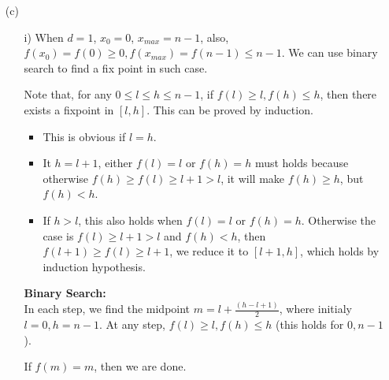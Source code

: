 \documentclass[twoside]{homework}
\begin{document}
\begin{enumerate}
\begin{proof}
			In the proof of (a), we keep calculating $x_i$ with the formula $x_{i+1} = f(x_{i})$. In each step, we calculate $x_{i+1} = f(x_i)$, if $x_{i+1} = f(x_i) = x_i$, then we find our fixpoint. Otherwise we go next step with $x_{i+2}$ base on $x_{i+1}$. Note that if $x_{i+1} = f(x_i) \neq x_i$, then at least one component of $x_{i+1}$ is at least 1 larger than that component of $x_i$ ($x_{i+1} > x_i$). If we don't see any fixpoint and we keep going on, then we run into $x_k = (n-1, n-1,...,n-1)$, at this point, it must hold that $x_{k+1} = f(x_k) = x_k$, because there exists no such d-tuple $x'$ in $G(d, n)$ s.t. $x' > x_k = (n-1, n-1, ..., n-1)$.

			The maximum number of steps we can do until we get $(n-1, n-1, ..., n-1)$ is $O(nd)$. In each step, we only need to evaluate $f$ on $x_i$ and compare $f(x_i)$ with $x_i$, which can be done in $O(1)$. Therefore a fixpoint can be found in time $O(nd)$.
		\end{proof}

	\item [(c)]
		\begin{enumerate}
			\item [i)] When $d=1$, $x_0 = 0$, $x_{max} = n-1$, also, $f(x_0) = f(0) \geq 0, f(x_{max}) = f(n-1) \leq n-1$. We can use binary search to find a fix point in such case.

			Note that,
				for any $0 \leq l \leq h \leq n-1$, if $f(l) \geq l, f(h) \leq h$, then there exists a fixpoint in $[l, h]$.
			This can be proved by induction.
			\begin{itemize}
				\item This is obvious if $l = h$.
				\item It $h = l + 1$, either $f(l) = l$ or $f(h) = h$ must holds because otherwise $f(h) \geq f(l) \geq l + 1 > l$, it will make $f(h) \geq h$, but $f(h) < h$.
				\item If $h > l$, this also holds when $f(l) = l$ or $f(h) = h$. Otherwise the case is $f(l) \geq l+1 > l$ and $f(h) < h$, then $f(l+1) \geq f(l) \geq l+1$, we reduce it to $[l+1, h]$, which holds by induction hypothesis.
			\end{itemize}

			\textbf{Binary Search:}\\
			In each step, we find the midpoint $m = l + \frac{(h - l + 1)}{2}$, where initialy $l = 0, h = n - 1$. At any step, $f(l) \geq l, f(h) \leq h$ (this holds for $0,n-1$).

			If $f(m) = m$, then we are done.


\end{enumerate}
\end{enumerate}
\end{document}
